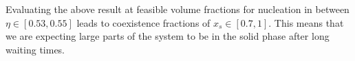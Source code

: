 

Evaluating the above result at feasible volume fractions for nucleation in between $\eta \in [0.53,0.55]$ leads to coexistence fractions of $x_s \in [0.7,1]$. This means that we are expecting large parts of the system to be in the solid phase after long waiting times.\\

